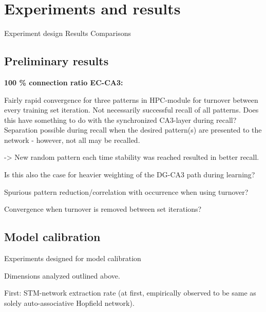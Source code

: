 
\chapter{Experiments and results}\label{chpt:experiments}
Experiment design
Results
Comparisons

\section{Preliminary results}

\textbf{100 \% connection ratio EC-CA3:}

Fairly rapid convergence for three patterns in HPC-module for turnover between every training set iteration. 
Not necessarily successful recall of all patterns. Does this have something to do with the synchronized CA3-layer during recall? Separation possible during recall when the desired pattern(s) are presented to the network - however, not all may be recalled.

-> New random pattern each time stability was reached resulted in better recall.

Is this also the case for heavier weighting of the DG-CA3 path during learning?

Spurious pattern reduction/correlation with occurrence when using turnover?

Convergence when turnover is removed between set iterations?

\section{Model calibration}

Experiments designed for model calibration

Dimensions analyzed outlined above.

First: STM-network extraction rate (at first, empirically observed to be same as solely auto-associative Hopfield network).



\cleardoublepage